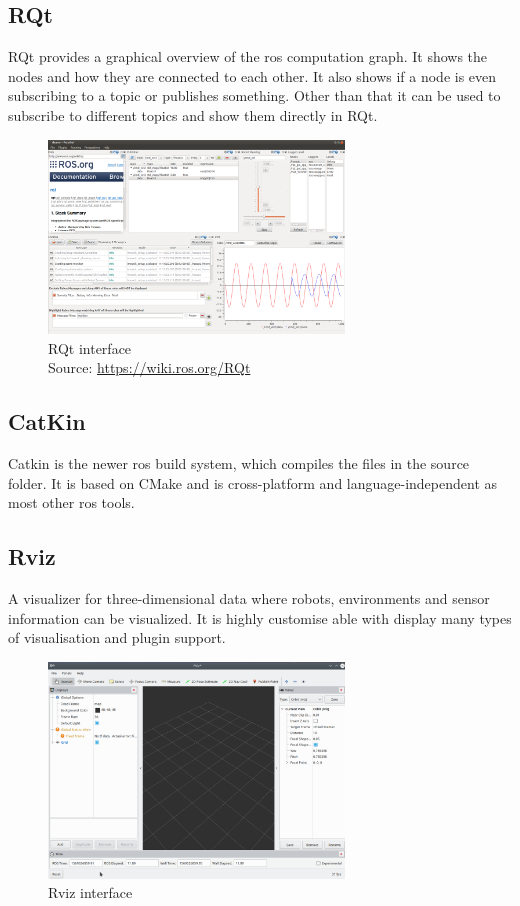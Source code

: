 \subsection{RQt}\label{rqt}
RQt provides a graphical overview of the \gls{ros} computation graph. It shows the nodes and how they are connected to each other. It also shows if a node is even subscribing to a topic or publishes something. Other than that it can be used to subscribe to different topics and show them directly in RQt.
\begin{figure}[h]
	\centering
	\includegraphics[width=0.7\textwidth]{./media/images/RQt}
  	\caption{RQt interface\\Source: \url{https://wiki.ros.org/RQt}}
  	\label{rqtinterface}
\end{figure}

\subsection{CatKin}\label{catkin}
Catkin is the newer \gls{ros} build system, which compiles the files in the source folder. It is based on CMake and is cross-platform and language-independent as most other \gls{ros} tools.

\subsection{Rviz}\label{rviz}
A visualizer for three-dimensional data where robots, environments and sensor information can be visualized. It is highly customise able with display many types of visualisation and plugin support. \newline
\begin{figure}[h]
	\centering
	\includegraphics[width=0.7\textwidth]{./media/images/rviz}
  	\caption{Rviz interface}
  	\label{rvizinterface}
\end{figure}

